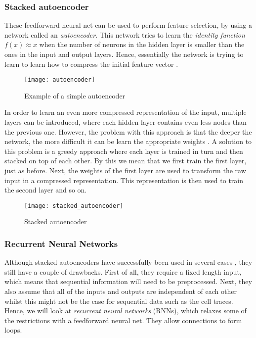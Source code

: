 \subsubsection{Stacked autoencoder}

These feedforward neural net can be used to perform feature selection, by using a network called an \textit{autoencoder}.
This network tries to learn the \textit{identity function} $f(x) \approx x$ when the number of neurons in the hidden layer is smaller than the ones in the input and output layers.
Hence, essentially the network is trying to learn to learn how to compress the initial feature vector \cite{autoencoders}.

\begin{figure}[h]
  \centering
  \texttt{[image: autoencoder]}
  \caption{Example of a simple autoencoder}
  \label{fig:autoencoder}
\end{figure}

In order to learn an even more compressed representation of the input, multiple layers can be introduced, where each hidden layer contains even less nodes than the previous one.
However, the problem with this approach is that the deeper the network, the more difficult it can be learn the appropriate weights \cite{nielsen_2017}.
A solution to this problem is a greedy approach where each layer is trained in turn and then stacked on top of each other.
By this we mean that we first train the first layer, just as before.
Next, the weights of the first layer are used to transform the raw input in a compressed representation.
This representation is then used to train the second layer and so on.

\begin{figure}[h]
  \centering
  \texttt{[image: stacked\_autoencoder]}
  \caption{Stacked autoencoder}
  \label{fig:stacked-autoencoder}
\end{figure}

\subsubsection{Recurrent Neural Networks}

Although stacked autoencoders have successfully been used in several cases \cite{deeplearningthesis,deeplearning2}, they still have a couple of drawbacks.
First of all, they require a fixed length input, which means that sequential information will need to be preprocessed.
Next, they also assume that all of the inputs and outputs are independent of each other \cite{britz_2016} whilst this might not be the case for sequential data such as the cell traces.
Hence, we will look at \textit{recurrent neural networks} (RNNs), which relaxes some of the restrictions with a feedforward neural net.
They allow connections to form loops.

